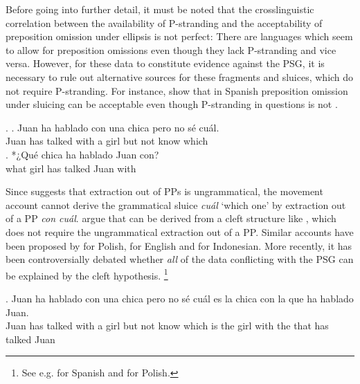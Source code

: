 Before going into further detail, it must be noted that the crosslinguistic correlation between the availability of P-stranding and the acceptability of preposition omission under ellipsis is not perfect: There are languages which seem to allow for preposition omissions even though they lack P-stranding and vice versa. However, for these data to constitute evidence against the PSG, it is necessary to rule out alternative sources for these fragments and sluices, which do not require P-stranding. For instance, \citet[176]{rodrigues.etal2009} show that in Spanish preposition omission under sluicing can be acceptable \Next[a] even though P-stranding in questions is not \Next[b].

\ex.
\ag. Juan ha hablado con una chica pero no sé cuál.\\
Juan has talked with a girl but not know which\\
\bg. *¿Qué chica ha hablado Juan con?\\
what girl has talked Juan with\\

\newpage
\noindent Since \Last[b] suggests that extraction out of PPs is ungrammatical, the movement account cannot derive the grammatical sluice \textit{cuál} `which one' by extraction out of a PP \textit{con cuál}. \citet[178]{rodrigues.etal2009} argue that \Last[a] can be derived from a cleft structure like \Next, which does not require the ungrammatical extraction out of a PP. Similar accounts have been proposed by \citet{szczegielniak2008} for Polish, \citet{vancraenenbroeck2010} for English and \citet{sato2011} for Indonesian. More recently, it has been controversially debated whether \textit{all} of the data conflicting with the PSG can be explained by the cleft hypothesis.%
%
\footnote{See e.g. \citet{stigliano2018, stigliano2019} for Spanish and \citet{nykiel2013} for Polish.}\afterfn%
%

\exg. Juan ha hablado con una chica pero no sé cuál es la chica con la que ha hablado Juan.\\
Juan has talked with a girl but not know which is the girl with the that has talked Juan\\

